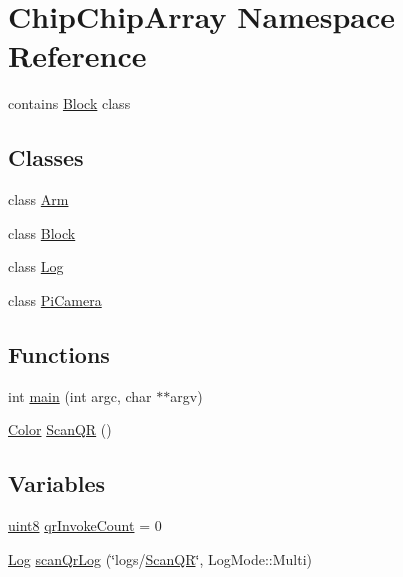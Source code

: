 \hypertarget{namespaceChipChipArray}{\section{Chip\+Chip\+Array Namespace Reference}
\label{namespaceChipChipArray}
}


contains \hyperlink{classChipChipArray_1_1Block}{Block} class  


\subsection*{Classes}
\begin{DoxyCompactItemize}
\item 
class \hyperlink{classChipChipArray_1_1Arm}{Arm}
\item 
class \hyperlink{classChipChipArray_1_1Block}{Block}
\item 
class \hyperlink{classChipChipArray_1_1Log}{Log}
\item 
class \hyperlink{classChipChipArray_1_1PiCamera}{Pi\+Camera}
\end{DoxyCompactItemize}
\subsection*{Functions}
\begin{DoxyCompactItemize}
\item 
int \hyperlink{namespaceChipChipArray_a7fc3d1edffca11531cd09fdab7c8b88d}{main} (int argc, char $\ast$$\ast$argv)
\item 
\hyperlink{definitions_8hpp_abc05a0f46084a3477cf5d5c939ff1436}{Color} \hyperlink{namespaceChipChipArray_a6c7465049b5d408e1a238b6d8ffa887d}{Scan\+Q\+R} ()
\end{DoxyCompactItemize}
\subsection*{Variables}
\begin{DoxyCompactItemize}
\item 
\hyperlink{definitions_8hpp_adde6aaee8457bee49c2a92621fe22b79}{uint8} \hyperlink{namespaceChipChipArray_a3b2a3c0ffa9f53021293aeb4955d2fef}{qr\+Invoke\+Count} = 0
\item 
\hyperlink{classChipChipArray_1_1Log}{Log} \hyperlink{namespaceChipChipArray_ab5c6290951637c25a5422707020fb3a8}{scan\+Qr\+Log} (\char`\"{}logs/\hyperlink{namespaceChipChipArray_a6c7465049b5d408e1a238b6d8ffa887d}{Scan\+Q\+R}\char`\"{}, Log\+Mode\+::\+Multi)
\end{DoxyCompactItemize}


